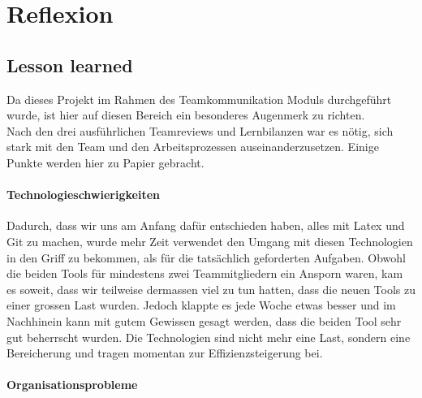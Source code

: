 \chapter{Reflexion}

\section{Lesson learned}

Da dieses Projekt im Rahmen des Teamkommunikation Moduls durchgeführt wurde, ist hier auf diesen Bereich ein besonderes Augenmerk zu richten. \\
Nach den drei ausführlichen Teamreviews und Lernbilanzen war es nötig, sich stark mit den Team und den Arbeitsprozessen auseinanderzusetzen. Einige Punkte werden hier zu Papier gebracht.

\subsubsection{Technologieschwierigkeiten} \label{sec:techn}

Dadurch, dass wir uns am Anfang dafür entschieden haben, alles mit Latex und Git zu machen, wurde mehr Zeit verwendet den Umgang mit diesen Technologien in den Griff zu bekommen, als für die tatsächlich geforderten Aufgaben. Obwohl die beiden Tools für mindestens zwei Teammitgliedern ein Ansporn waren, kam es soweit, dass wir teilweise dermassen viel zu tun hatten, dass die neuen Tools zu einer grossen Last wurden. Jedoch klappte es jede Woche etwas besser und im Nachhinein kann mit gutem Gewissen gesagt werden, dass die beiden Tool sehr gut beherrscht wurden. Die Technologien sind nicht mehr eine Last, sondern eine Bereicherung und tragen momentan zur Effizienzsteigerung bei.

\subsubsection {Organisationsprobleme} \label{sec:orgprob}

